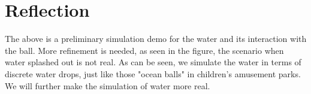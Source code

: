 \documentclass{article}
\newcommand\footurl[1]{\footnote{\url{#1}}}
\newcommand\urllink[2]{#1\footurl{#2}}
\begin{document}
\section{Reflection}
\hspace*{1em} The above is a preliminary simulation demo for the water and its interaction with the ball. More refinement is needed, as seen in the figure, the scenario when water splashed out is not real. 
\noindent\hspace*{1em} As can be seen, we simulate the water in terms of discrete water drops, just like those "ocean balls" in children's amusement parks. We will further make the simulation of water more real.









\end{document}
